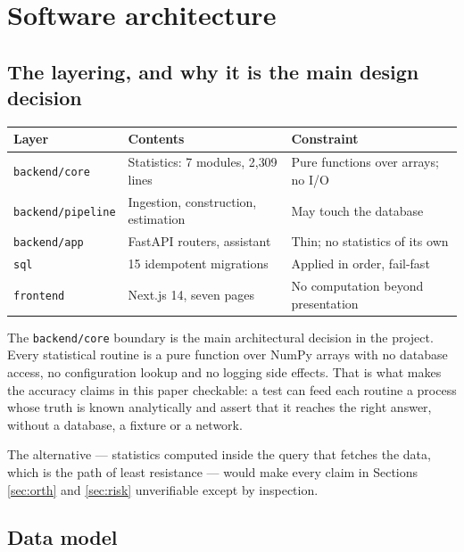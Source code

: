 \documentclass[11pt,a4paper]{article}
\newcommand{\code}[1]{\texttt{\small #1}}
\begin{document}
\section{Software architecture}
\label{sec:arch}

\subsection{The layering, and why it is the main design decision}

\begin{center}
\small
\begin{tabularx}{\textwidth}{@{}lXX@{}}
\toprule
\textbf{Layer} & \textbf{Contents} & \textbf{Constraint} \\
\midrule
\code{backend/core} & Statistics: 7 modules, 2{,}309 lines & Pure functions over arrays; no I/O \\
\code{backend/pipeline} & Ingestion, construction, estimation & May touch the database \\
\code{backend/app} & FastAPI routers, assistant & Thin; no statistics of its own \\
\code{sql} & 15 idempotent migrations & Applied in order, fail-fast \\
\code{frontend} & Next.js 14, seven pages & No computation beyond presentation \\
\bottomrule
\end{tabularx}
\end{center}

The \code{backend/core} boundary is the main architectural decision in the project.
Every statistical routine is a pure function over NumPy arrays with no database
access, no configuration lookup and no logging side effects. That is what makes the
accuracy claims in this paper checkable: a test can feed each routine a process whose
truth is known analytically and assert that it reaches the right answer, without a
database, a fixture or a network.

The alternative --- statistics computed inside the query that fetches the data, which
is the path of least resistance --- would make every claim in Sections
\ref{sec:orth} and \ref{sec:risk} unverifiable except by inspection.

\subsection{Data model}
\end{document}
